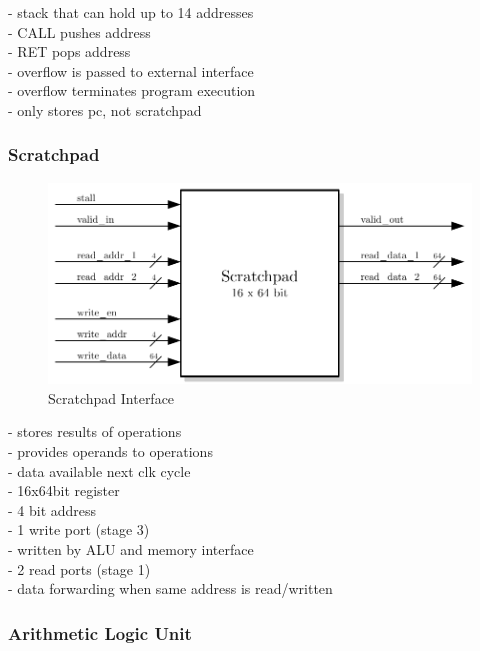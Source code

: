 - stack that can hold up to 14 addresses\\
- CALL pushes address\\
- RET pops address\\
- overflow is passed to external interface\\
- overflow terminates program execution\\
- only stores pc, not scratchpad\\

\subsubsection{Scratchpad}

\begin{figure}[htb]
 \centering
 \includegraphics[scale=1.0]{images/scratchpad_blackbox}
 \caption{Scratchpad Interface}
\label{fig:scp_inf}
\end{figure}

- stores results of operations\\
- provides operands to operations\\
- data available next clk cycle\\
- 16x64bit register\\
- 4 bit address\\
- 1 write port (stage 3)\\
- written by ALU and memory interface\\
- 2 read ports (stage 1)\\
- data forwarding when same address is read/written\\


\subsubsection{Arithmetic Logic Unit}

